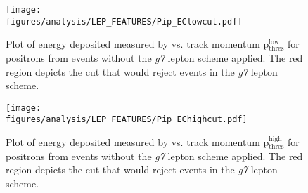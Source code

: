 \begin{figure}[h!]\begin{center}
\texttt{[image: \\figures/analysis/LEP\_FEATURES/Pip\_EClowcut.pdf]}
\caption[ Deposited Energy Comparison to Track Momentum for e$^+$ Candidates]{\label{fig:islep.pipEC}Plot of energy deposited measured by  vs. track momentum p$\mathrm{_{thres}^{low}}$ for positrons from \piz events without the \emph{g7} lepton   scheme applied. The red region depicts the cut that would reject events in the \emph{g7} lepton   scheme.}
\end{center}\end{figure}

\begin{figure}[h!]\begin{center}
\texttt{[image: \\figures/analysis/LEP\_FEATURES/Pip\_EChighcut.pdf]}
\caption[ Deposited Energy Comparison to Track Momentum for e$^+$ from \piz Events]{\label{fig:islep.pipECcut}Plot of energy deposited measured by  vs. track momentum p$\mathrm{_{thres}^{high}}$ for positrons from \piz events without the \emph{g7} lepton   scheme applied. The red region depicts the cut that would reject events in the \emph{g7} lepton   scheme.}
\end{center}\end{figure}
%


\FloatBarrier
